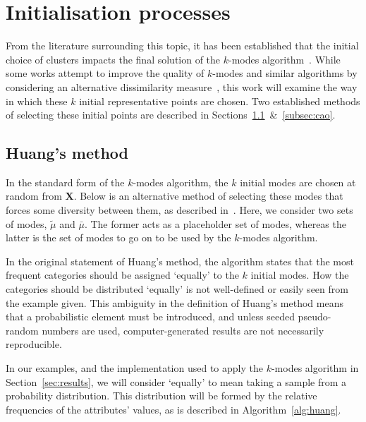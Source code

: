 \section{Initialisation processes}\label{sec:init}

From the literature surrounding this topic, it has been established that the 
initial choice of clusters impacts the final solution of the \(k\)-modes
algorithm~\cite{Cao2009, Huang1998}. While some works attempt to improve the
quality of \(k\)-modes and similar algorithms by considering an alternative 
dissimilarity measure~\cite{Ng2007}, this work will examine the way in which
these \(k\) initial representative points are chosen. Two established methods of 
selecting these initial points are described in
Sections~\ref{subsec:huang}~\&~\ref{subsec:cao}.


\subsection{Huang's method}\label{subsec:huang}

In the standard form of the \(k\)-modes algorithm, the \(k\) initial modes are 
chosen at random from \textbf{X}. Below is an alternative method of selecting
these modes that forces some diversity between them, as described 
in~\cite{Huang1998}. Here, we consider two sets of modes, \(\tilde{\mu}\) and
\(\bar{\mu}\). The former acts as a placeholder set of modes, whereas the latter
is the set of modes to go on to be used by the \(k\)-modes algorithm.

\begin{singlespace}
    
\end{singlespace}

In the original statement of Huang's method, the algorithm states that the most
frequent categories should be assigned `equally' to the \(k\) initial modes. How
the categories should be distributed `equally' is not well-defined or easily
seen from the example given. This ambiguity in the definition of Huang's method
means that a probabilistic element must be introduced, and unless seeded
pseudo-random numbers are used, computer-generated results are not necessarily
reproducible.

In our examples, and the implementation used to apply the \(k\)-modes algorithm
in Section~\ref{sec:results}, we will consider `equally' to mean taking a sample
from a probability distribution. This distribution will be formed by the
relative frequencies of the attributes' values, as is described in
Algorithm~\ref{alg:huang}.


